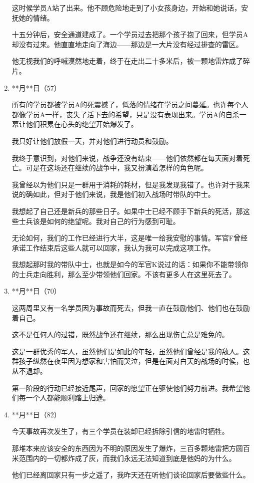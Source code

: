 \begin{enumerate}
这时候学员A站了出来。他不顾危险地走到了小女孩身边，开始和她说话，安抚她的情绪。

十五分钟后，安全通道建成了。一个学员过去把那个孩子抱了回来，但学员A却没有过来。他直直地走向了海边——那边是一大片没有经过排查的雷区。

他无视我们的呼喊漠然地走着，终于在走出二十多米后，被一颗地雷炸成了碎片。
    \item **月**日（57）

所有的学员都被学员A的死震撼了，低落的情绪在学员之间蔓延。也许每个人都像学员A一样，丧失了活下去的希望，只是没有表现出来。学员A的自杀一幕让他们积累在心头的绝望开始爆发了。

我只好让他们放假一天，并对他们进行动员和鼓励。

我终于意识到，对他们来说，战争还没有结束——他们依然都在每天面对着死亡。可是在这场还在继续的战争中，我又扮演着怎样的角色呢。

我曾经以为他们只是一群用于消耗的耗材，但是我发现我错了。也许对于我来说的确如此，但对于他们来说，我是他们初入战场时带队的中士。

我想起了自己还是新兵的那些日子。如果中士已经不顾手下新兵的死活，那这些士兵该是如何的绝望呢。我对自己的行为感到可耻。

无论如何，我们的工作已经进行大半，这是唯一给我安慰的事情。军官F曾经承诺工作结束后这些人就可以回家，我认为我可以完成这项工作。

我想起那时我的带队中士，也就是如今的军官K说过的话：如果你不能带领你的士兵走向胜利，那么至少带领他们回家。不该有更多人在这里死去了。
    \item **月**日（70）

这两周里又有一名学员因为事故而死去，但我一直在鼓励他们、他们也在鼓励着自己。

这不是任何人的过错，既然战争还在继续，那么出现伤亡总是难免的。

这是一群优秀的军人，虽然他们是如此的年轻，虽然他们曾经是我的敌人。这群孩子纵然在夜里因为想家和害怕而哭泣，但是在面对白天的战场的时候，也从不退却。

第一阶段的行动已经接近尾声，回家的愿望正在驱使他们努力前进。我希望他们每一个人都能顺利踏上归途。
    \item **月**日（82）

今天事故再次发生了，有三个学员在装卸已经拆除引信的地雷时牺牲。

那堆本来应该安全的东西因为不明的原因发生了爆炸，三百多颗地雷把方圆百米范围内的一切都炸成了灰，而我们永远无法知道到底是他妈的为什么。

他们已经离回家只有一步之遥了，我昨天还在听他们谈论回家后要做些什么。


\end{enumerate}
